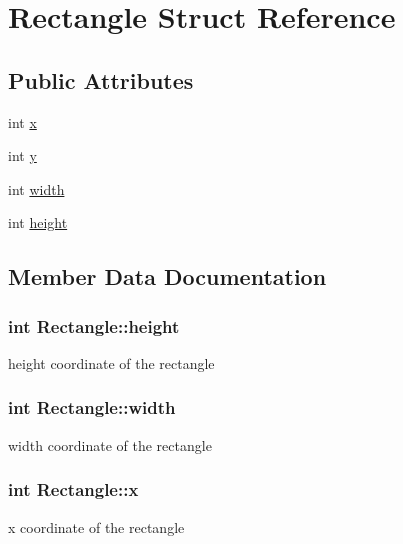 \hypertarget{structRectangle}{}\section{Rectangle Struct Reference}
\label{structRectangle}
\subsection*{Public Attributes}
\begin{DoxyCompactItemize}
\item 
int \hyperlink{structRectangle_a7f6d033b3bb8dcf7bf8f82044592c904}{x}
\item 
int \hyperlink{structRectangle_acfb20b2cecf8c9701fb12fbbfebe6cea}{y}
\item 
int \hyperlink{structRectangle_a019ed802523594472e0032953b6062d4}{width}
\item 
int \hyperlink{structRectangle_ac564db1ed0dd61dd82a5276399bc72ad}{height}
\end{DoxyCompactItemize}


\subsection{Member Data Documentation}
\subsubsection[{\texorpdfstring{height}{height}}]{\setlength{\rightskip}{0pt plus 5cm}int Rectangle\+::height}\hypertarget{structRectangle_ac564db1ed0dd61dd82a5276399bc72ad}{}\label{structRectangle_ac564db1ed0dd61dd82a5276399bc72ad}
height coordinate of the rectangle 
\subsubsection[{\texorpdfstring{width}{width}}]{\setlength{\rightskip}{0pt plus 5cm}int Rectangle\+::width}\hypertarget{structRectangle_a019ed802523594472e0032953b6062d4}{}\label{structRectangle_a019ed802523594472e0032953b6062d4}
width coordinate of the rectangle 
\subsubsection[{\texorpdfstring{x}{x}}]{\setlength{\rightskip}{0pt plus 5cm}int Rectangle\+::x}\hypertarget{structRectangle_a7f6d033b3bb8dcf7bf8f82044592c904}{}\label{structRectangle_a7f6d033b3bb8dcf7bf8f82044592c904}
x coordinate of the rectangle 
